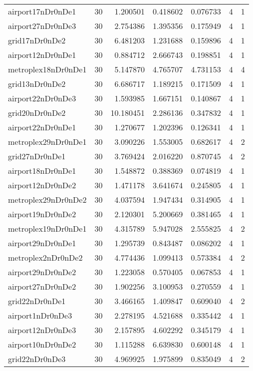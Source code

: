 \begin{longtable}{|l|r|r|r|r|r|r|}
airport17nDr0nDe1 & 30 & 1.200501 & 0.418602 & 0.076733 & 4 & 1 \\
airport27nDr0nDe3 & 30 & 2.754386 & 1.395356 & 0.175949 & 4 & 1 \\
grid17nDr0nDe2 & 30 & 6.481203 & 1.231688 & 0.159896 & 4 & 1 \\
airport12nDr0nDe1 & 30 & 0.884712 & 2.666743 & 0.198851 & 4 & 1 \\
metroplex18nDr0nDe1 & 30 & 5.147870 & 4.765707 & 4.731153 & 4 & 4 \\
grid13nDr0nDe2 & 30 & 6.686717 & 1.189215 & 0.171509 & 4 & 1 \\
airport22nDr0nDe3 & 30 & 1.593985 & 1.667151 & 0.140867 & 4 & 1 \\
grid20nDr0nDe2 & 30 & 10.180451 & 2.286136 & 0.347832 & 4 & 1 \\
airport22nDr0nDe1 & 30 & 1.270677 & 1.202396 & 0.126341 & 4 & 1 \\
metroplex29nDr0nDe1 & 30 & 3.090226 & 1.553005 & 0.682617 & 4 & 2 \\
grid27nDr0nDe1 & 30 & 3.769424 & 2.016220 & 0.870745 & 4 & 2 \\
airport18nDr0nDe1 & 30 & 1.548872 & 0.388369 & 0.074819 & 4 & 1 \\
airport12nDr0nDe2 & 30 & 1.471178 & 3.641674 & 0.245805 & 4 & 1 \\
metroplex29nDr0nDe2 & 30 & 4.037594 & 1.947434 & 0.314905 & 4 & 1 \\
airport19nDr0nDe2 & 30 & 2.120301 & 5.200669 & 0.381465 & 4 & 1 \\
metroplex19nDr0nDe1 & 30 & 4.315789 & 5.947028 & 2.555825 & 4 & 2 \\
airport29nDr0nDe1 & 30 & 1.295739 & 0.843487 & 0.086202 & 4 & 1 \\
metroplex2nDr0nDe2 & 30 & 4.774436 & 1.099413 & 0.573384 & 4 & 2 \\
airport29nDr0nDe2 & 30 & 1.223058 & 0.570405 & 0.067853 & 4 & 1 \\
airport27nDr0nDe2 & 30 & 1.902256 & 3.100953 & 0.270559 & 4 & 1 \\
grid22nDr0nDe1 & 30 & 3.466165 & 1.409847 & 0.609040 & 4 & 2 \\
airport1nDr0nDe3 & 30 & 2.278195 & 4.521688 & 0.335442 & 4 & 1 \\
airport12nDr0nDe3 & 30 & 2.157895 & 4.602292 & 0.345179 & 4 & 1 \\
airport10nDr0nDe2 & 30 & 1.115288 & 6.639830 & 0.600148 & 4 & 1 \\
grid22nDr0nDe3 & 30 & 4.969925 & 1.975899 & 0.835049 & 4 & 2 \\

\end{longtable}
